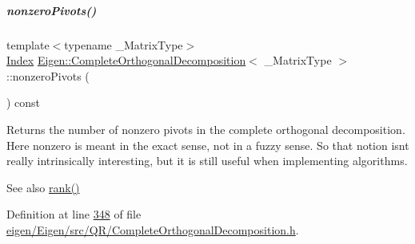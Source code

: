 \mbox{\label{group___q_r___module_af9d7a5bdbc16a4a0bf7394ef0dd208da}} 
\subparagraph{\texorpdfstring{nonzero\+Pivots()}{nonzeroPivots()}\hspace{0.1cm}{\footnotesize\ttfamily [2/2]}}
{\footnotesize\ttfamily template$<$typename \+\_\+\+Matrix\+Type$>$ \\
\hyperlink{namespace_eigen_a62e77e0933482dafde8fe197d9a2cfde}{Index} \hyperlink{group___q_r___module_class_eigen_1_1_complete_orthogonal_decomposition}{Eigen\+::\+Complete\+Orthogonal\+Decomposition}$<$ \+\_\+\+Matrix\+Type $>$\+::nonzero\+Pivots (\begin{DoxyParamCaption}{ }\end{DoxyParamCaption}) const\hspace{0.3cm}{\ttfamily [inline]}}

\begin{DoxyReturn}{Returns}
the number of nonzero pivots in the complete orthogonal decomposition. Here nonzero is meant in the exact sense, not in a fuzzy sense. So that notion isn\textquotesingle{}t really intrinsically interesting, but it is still useful when implementing algorithms.
\end{DoxyReturn}
\begin{DoxySeeAlso}{See also}
\hyperlink{group___q_r___module_af348f64b26f8467a020062c22b748806}{rank()} 
\end{DoxySeeAlso}


Definition at line \hyperlink{eigen_2_eigen_2src_2_q_r_2_complete_orthogonal_decomposition_8h_source_l00348}{348} of file \hyperlink{eigen_2_eigen_2src_2_q_r_2_complete_orthogonal_decomposition_8h_source}{eigen/\+Eigen/src/\+Q\+R/\+Complete\+Orthogonal\+Decomposition.\+h}.

